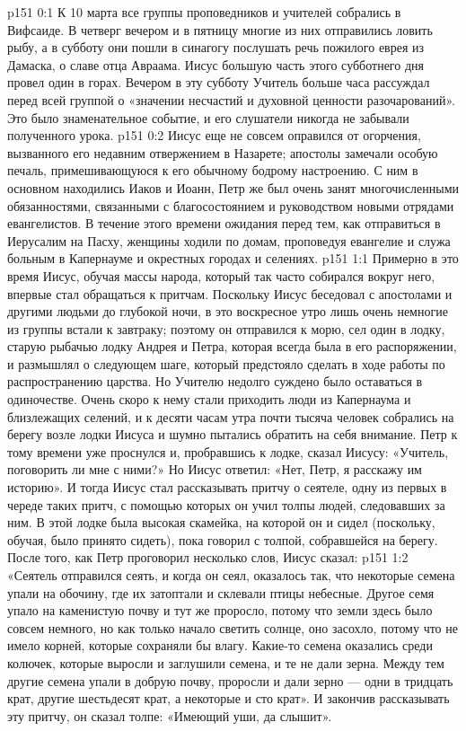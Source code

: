 \author{Комиссия срединников}
\vs p151 0:1 К 10 марта все группы проповедников и учителей собрались в Вифсаиде. В четверг вечером и в пятницу многие из них отправились ловить рыбу, а в субботу они пошли в синагогу послушать речь пожилого еврея из Дамаска, о славе отца Авраама. Иисус большую часть этого субботнего дня провел один в горах. Вечером в эту субботу Учитель больше часа рассуждал перед всей группой о «значении несчастий и духовной ценности разочарований». Это было знаменательное событие, и его слушатели никогда не забывали полученного урока.
\vs p151 0:2 Иисус еще не совсем оправился от огорчения, вызванного его недавним отвержением в Назарете; апостолы замечали особую печаль, примешивающуюся к его обычному бодрому настроению. С ним в основном находились Иаков и Иоанн, Петр же был очень занят многочисленными обязанностями, связанными с благосостоянием и руководством новыми отрядами евангелистов. В течение этого времени ожидания перед тем, как отправиться в Иерусалим на Пасху, женщины ходили по домам, проповедуя евангелие и служа больным в Капернауме и окрестных городах и селениях.
\vs p151 1:1 Примерно в это время Иисус, обучая массы народа, который так часто собирался вокруг него, впервые стал обращаться к притчам. Поскольку Иисус беседовал с апостолами и другими людьми до глубокой ночи, в это воскресное утро лишь очень немногие из группы встали к завтраку; поэтому он отправился к морю, сел один в лодку, старую рыбачью лодку Андрея и Петра, которая всегда была в его распоряжении, и размышлял о следующем шаге, который предстояло сделать в ходе работы по распространению царства. Но Учителю недолго суждено было оставаться в одиночестве. Очень скоро к нему стали приходить люди из Капернаума и близлежащих селений, и к десяти часам утра почти тысяча человек собрались на берегу возле лодки Иисуса и шумно пытались обратить на себя внимание. Петр к тому времени уже проснулся и, пробравшись к лодке, сказал Иисусу: «Учитель, поговорить ли мне с ними?» Но Иисус ответил: «Нет, Петр, я расскажу им историю». И тогда Иисус стал рассказывать притчу о сеятеле, одну из первых в череде таких притч, с помощью которых он учил толпы людей, следовавших за ним. В этой лодке была высокая скамейка, на которой он и сидел (поскольку, обучая, было принято сидеть), пока говорил с толпой, собравшейся на берегу. После того, как Петр проговорил несколько слов, Иисус сказал:
\vs p151 1:2 \pc «Сеятель отправился сеять, и когда он сеял, оказалось так, что некоторые семена упали на обочину, где их затоптали и склевали птицы небесные. Другое семя упало на каменистую почву и тут же проросло, потому что земли здесь было совсем немного, но как только начало светить солнце, оно засохло, потому что не имело корней, которые сохраняли бы влагу. Какие\hyp{}то семена оказались среди колючек, которые выросли и заглушили семена, и те не дали зерна. Между тем другие семена упали в добрую почву, проросли и дали зерно --- одни в тридцать крат, другие шестьдесят крат, а некоторые и сто крат». И закончив рассказывать эту притчу, он сказал толпе: «Имеющий уши, да слышит».
